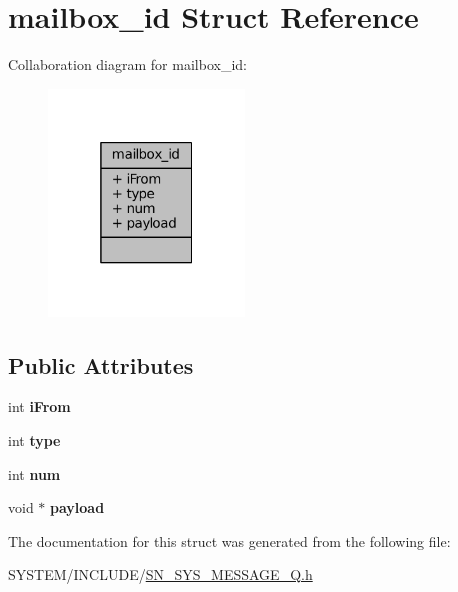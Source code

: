\hypertarget{structmailbox__id}{}\section{mailbox\+\_\+id Struct Reference}
\label{structmailbox__id}


Collaboration diagram for mailbox\+\_\+id\+:\nopagebreak
\begin{figure}[H]
\begin{center}
\leavevmode
\includegraphics[width=148pt]{structmailbox__id__coll__graph}
\end{center}
\end{figure}
\subsection*{Public Attributes}
\begin{DoxyCompactItemize}
\item 
\mbox{\label{structmailbox__id_a83aa0ad540b0097aaeafd8c1a3faa778}} 
int {\bfseries i\+From}
\item 
\mbox{\label{structmailbox__id_a3ca678cf747b91897dd22c66c9bba659}} 
int {\bfseries type}
\item 
\mbox{\label{structmailbox__id_a4425340b7dd14e6e92d9f6e63c330a79}} 
int {\bfseries num}
\item 
\mbox{\label{structmailbox__id_adf293901b5410f4bd835ce5d754b4a1d}} 
void $\ast$ {\bfseries payload}
\end{DoxyCompactItemize}


The documentation for this struct was generated from the following file\+:\begin{DoxyCompactItemize}
\item 
S\+Y\+S\+T\+E\+M/\+I\+N\+C\+L\+U\+D\+E/\hyperlink{SN__SYS__MESSAGE__Q_8h}{S\+N\+\_\+\+S\+Y\+S\+\_\+\+M\+E\+S\+S\+A\+G\+E\+\_\+\+Q.\+h}\end{DoxyCompactItemize}
